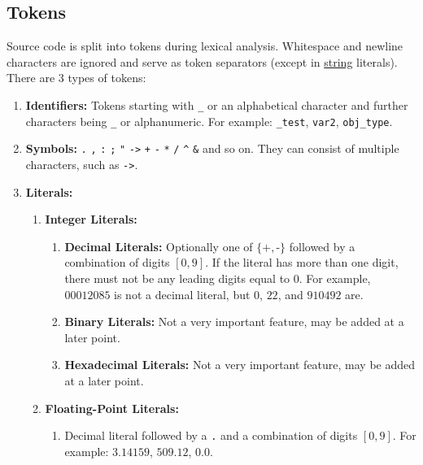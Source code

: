 \documentclass[leqno,12pt]{article}
\begin{document}
    \subsection{Tokens}
    Source code is split into tokens during lexical analysis. Whitespace and newline characters
    are ignored and serve as token separators (except in \hyperref[strings_section]{string} literals).
    \bigskip \\
    There are 3 types of tokens:
    \begin{enumerate}
        \item
        \textbf{Identifiers:} Tokens starting with \texttt{\_} or an alphabetical character
        and further characters being \texttt{\_} or alphanumeric. For example:
        \texttt{\_test}, \texttt{var2}, \texttt{obj\_type}.

        \item
        \textbf{Symbols:} \texttt{.} \texttt{,} \texttt{:} \texttt{;} \texttt{"} \texttt{->}
        \texttt{+} \texttt{-} \texttt{*} \texttt{/} \texttt{\textasciicircum} \texttt{\&} and so on.
        They can consist of multiple characters, such as \texttt{->}.

        \item
        \textbf{Literals:}
        \begin{enumerate}
            \item
            \textbf{Integer Literals:}
            \begin{enumerate}[label=(\roman*)]
                \item
                \textbf{Decimal Literals:} Optionally one of $\{\texttt{+}, \texttt{-}\}$ followed by
                a combination of digits $[0,9]$. If the literal has more than one digit,
                there must not be any leading digits equal to $0$. For example, $00012085$ is not
                a decimal literal, but $0$, $22$, and $910492$ are.

                \item
                \textbf{Binary Literals:}
                Not a very important feature, may be added at a later point.
                \item
                \textbf{Hexadecimal Literals:}
                Not a very important feature, may be added at a later point.
            \end{enumerate}

            \item
            \textbf{Floating-Point Literals:}
            \begin{enumerate}[label=(\roman*)]
                \item
                Decimal literal followed by a \texttt{.} and a combination of digits $[0,9]$.
                For example: $3.14159$, $509.12$, $0.0$.
            \end{enumerate}


\end{enumerate}
\end{enumerate}
\end{document}

